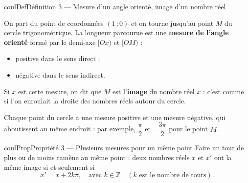 \documentclass[11pt,a4paper]{article}
\makeatletter
\newcounter{lycee@signet}
\newcommand{\signet}[3][]{\stepcounter{lycee@signet}%
  \edef\lycee@dest{\if\relax\detokenize{#1}\relax
    signet.\arabic{lycee@signet}\else#1\fi}%
  \hypertarget{\lycee@dest}{}\bookmark[level=#2,dest=\lycee@dest]{#3}}
\newenvironment{definitionbox}[1][Définition]%
  {\begin{boitecours}[phantom={\signet{2}{#1}}]{coulDef}{#1}}{\end{boitecours}}
\newenvironment{proprietebox}[1][Propriété]%
  {\begin{boitecours}[phantom={\signet{2}{#1}}]{coulProp}{#1}}{\end{boitecours}}
\makeatother
\begin{document}
\begin{definitionbox}[Définition 3 --- Mesure d'un angle orienté, image d'un nombre réel]
\begin{minipage}[c]{0.66\linewidth}\raggedright
On part du point de coordonnées $(1\,;0)$ et on tourne jusqu'au point $M$ du cercle
trigonométrique. La longueur parcourue est une \textbf{mesure de l'angle orienté} formé
par le demi-axe $[Ox)$ et $[OM)$ :
\begin{itemize}
  \item positive dans le sens direct ;
  \item négative dans le sens indirect.
\end{itemize}
Si $x$ est cette mesure, on dit que $M$ est l'\textbf{image} du nombre réel $x$ : c'est
comme si l'on enroulait la droite des nombres réels autour du cercle.

\smallskip
Chaque point du cercle a une mesure positive et une mesure négative, qui aboutissent au
même endroit : par exemple, $\dfrac{\pi}{2}$ et $-\dfrac{3\pi}{2}$ pour le point $M$.
\end{minipage}\hfill
\begin{minipage}[c]{0.30\linewidth}\centering
{}
\end{minipage}
\end{definitionbox}

\begin{proprietebox}[Propriété 3 --- Plusieurs mesures pour un même point]
Faire un tour de plus ou de moins ramène au même point : deux nombres réels $x$ et $x'$
ont la même image si et seulement si
\[ x'=x+2k\pi,\quad\text{avec }k\in\mathbb{Z}\quad(k\text{ est le nombre de tours}). \]
\end{proprietebox}
\end{document}
